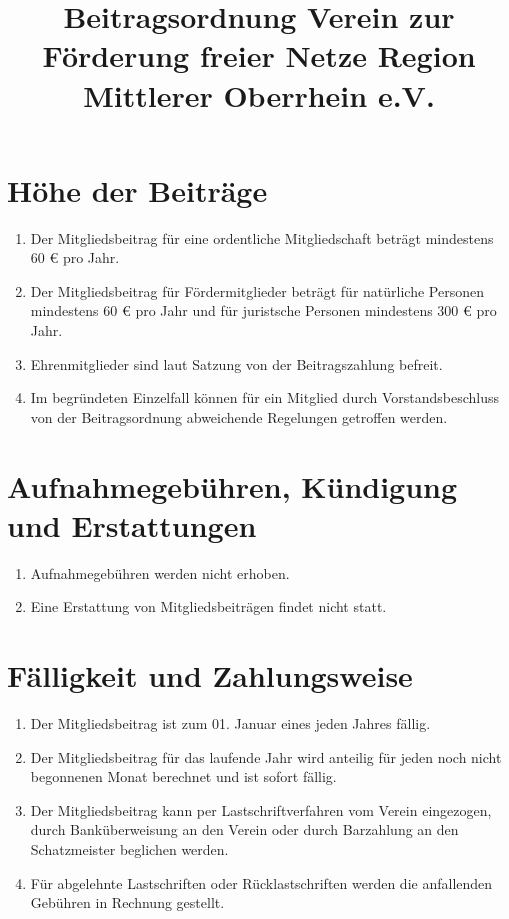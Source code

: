 \documentclass[12pt,a4paper,titlepage]{scrartcl}
\title{Beitragsordnung Verein zur Förderung freier Netze Region Mittlerer Oberrhein e.V.}
\begin{document}
\maketitle
{}
\thispagestyle{empty}
\newpage
{}
\setcounter{page}{1}

\section{Höhe der Beiträge}
\begin{enumerate}
\item Der Mitgliedsbeitrag für eine ordentliche Mitgliedschaft beträgt mindestens 60 \euro{} pro Jahr.
\item Der Mitgliedsbeitrag für Fördermitglieder beträgt für natürliche Personen mindestens 60 \euro{} pro Jahr und für juristsche Personen mindestens 300 \euro{} pro Jahr.
\item Ehrenmitglieder sind laut Satzung von der Beitragszahlung befreit.
\item Im begründeten Einzelfall können für ein Mitglied durch Vorstandsbeschluss von der Beitragsordnung abweichende Regelungen getroffen werden.
\end{enumerate}
	
\section{Aufnahmegebühren, Kündigung und Erstattungen}
\begin{enumerate}
\item Aufnahmegebühren werden nicht erhoben.
\item Eine Erstattung von Mitgliedsbeiträgen findet nicht statt.
\end{enumerate}


\section{Fälligkeit und Zahlungsweise}
\begin{enumerate}
\item Der Mitgliedsbeitrag ist zum 01. Januar eines jeden Jahres fällig.
\item Der Mitgliedsbeitrag für das laufende Jahr wird anteilig für jeden noch nicht begonnenen Monat berechnet und ist sofort fällig.
\item Der Mitgliedsbeitrag kann per Lastschriftverfahren vom Verein eingezogen, durch Banküberweisung an den Verein oder durch Barzahlung an den Schatzmeister beglichen werden.
\item Für abgelehnte Lastschriften oder Rücklastschriften werden die anfallenden Gebühren in Rechnung gestellt.
\end{enumerate}
\end{document}

